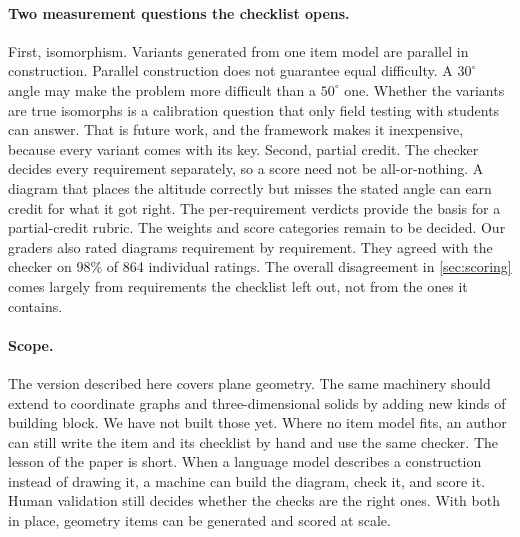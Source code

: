 \paragraph{Two measurement questions the checklist opens.}
First, isomorphism. Variants generated from one item model are parallel in construction. Parallel construction does not guarantee equal difficulty. A $30^\circ$ angle may make the problem more difficult than a $50^\circ$ one. Whether the variants are true isomorphs is a calibration question that only field testing with students can answer. That is future work, and the framework makes it inexpensive, because every variant comes with its key. Second, partial credit. The checker decides every requirement separately, so a score need not be all-or-nothing. A diagram that places the altitude correctly but misses the stated angle can earn credit for what it got right. The per-requirement verdicts provide the basis for a partial-credit rubric. The weights and score categories remain to be decided. Our graders also rated diagrams requirement by requirement. They agreed with the checker on 98\% of 864 individual ratings. The overall disagreement in \cref{sec:scoring} comes largely from requirements the checklist left out, not from the ones it contains.

\paragraph{Scope.}
The version described here covers plane geometry. The same machinery should extend to coordinate graphs and three-dimensional solids by adding new kinds of building block. We have not built those yet. Where no item model fits, an author can still write the item and its checklist by hand and use the same checker. The lesson of the paper is short. When a language model describes a construction instead of drawing it, a machine can build the diagram, check it, and score it. Human validation still decides whether the checks are the right ones. With both in place, geometry items can be generated and scored at scale.
